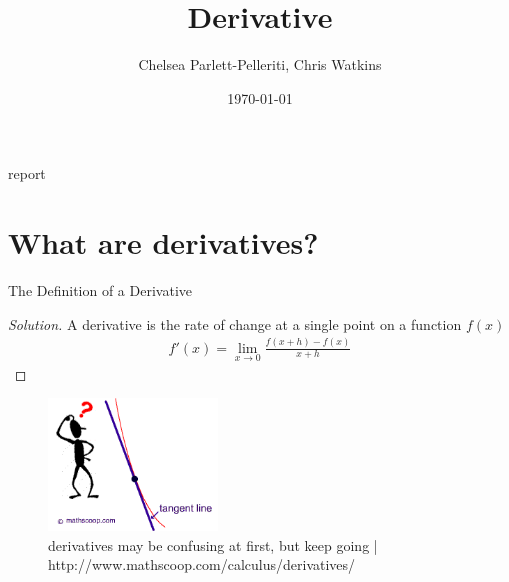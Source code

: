 \documentclass[aps,pra,notitlepage,amsmath,amssymb,letterpaper,12pt]{revtex4-1}
\newenvironment{problem}[2][Problem]{\begin{trivlist}
\item[\hskip \labelsep {\bfseries #1}\hskip \labelsep {\bfseries #2.}]}{\end{trivlist}}
\newenvironment{solution}{\begin{proof}[Solution]}{\end{proof}}
\begin{document}
{report}
 
\title{Derivative}
\author{Chelsea Parlett-Pelleriti, Chris Watkins}
\date{\today}
\maketitle

\section{What are derivatives?} %

\begin{problem}{1} 
The Definition of a Derivative
\end{problem}
 
\begin{solution} %
A derivative is the rate of change at a single point on a function $f(x)$ 
\begin{align}
f'(x) = \lim_{x \rightarrow 0} \frac{f(x+h)-f(x)}{x+h}
\end{align}
\end{solution}



\begin{figure}[h!] %
  \includegraphics[width=0.4\textwidth]{1.png}  %
  \caption{derivatives may be confusing at first, but keep going | http://www.mathscoop.com/calculus/derivatives/}
  \label{fig:figlabel}
\end{figure}

 
 
\end{document}
